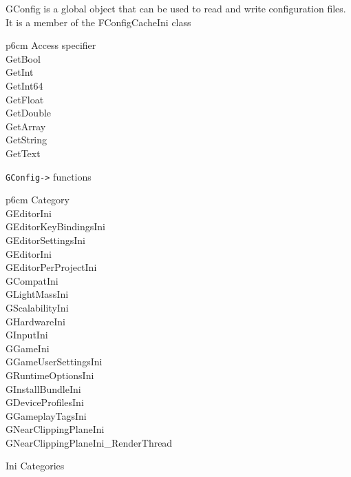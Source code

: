 \documentclass{scrbook}
\newcommand{\code}[1]{\colorbox{mygray}{\lstinline|#1|}}
\begin{document}
            GConfig is a global object that can be used to read and write configuration files. It is a member of the FConfigCacheIni class \\
            \begin{table}[!htb]
                \begin{tblr}{p{6cm}}
                    \hline
                        Access specifier \\
                    \hline
                        GetBool  \\
                        GetInt  \\
                        GetInt64  \\
                        GetFloat  \\
                        GetDouble  \\
                        GetArray  \\
                        GetString  \\
                        GetText  \\
                    \hline
                \end{tblr}
            \caption{ \code{GConfig->} functions }  
            \end{table}

            \begin{table}[!htb]
                \begin{tblr}{p{6cm}}
                    \hline
                        Category \\
                    \hline
                        GEditorIni \\
                        GEditorKeyBindingsIni \\
                        GEditorSettingsIni \\
                        GEditorIni \\
                        GEditorPerProjectIni \\
                        GCompatIni \\
                        GLightMassIni \\
                        GScalabilityIni \\
                        GHardwareIni \\
                        GInputIni \\
                        GGameIni \\
                        GGameUserSettingsIni \\
                        GRuntimeOptionsIni \\
                        GInstallBundleIni \\
                        GDeviceProfilesIni \\
                        GGameplayTagsIni \\
                        GNearClippingPlaneIni \\
                        GNearClippingPlaneIni\_RenderThread \\
                    \hline
                \end{tblr} 
            \caption{ Ini Categories }  
            \end{table}
            
\end{document}
